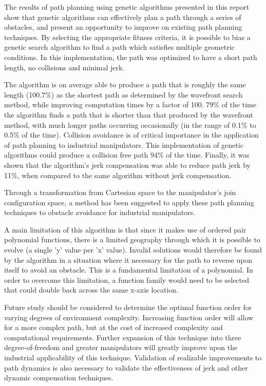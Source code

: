 The results of path planning using genetic algorithms presented in this report show that genetic algorithms can effectively plan a path through a series of obstacles, and present an opportunity to improve on existing path planning techniques. By selecting the appropriate fitness criteria, it is possible to bias a genetic search algorithm to find a path which satisfies multiple geometric conditions. In this implementation, the path was optimized to have a short path length, no collisions and minimal jerk.

The algorithm is on average able to produce a path that is roughly the same length (100.7\%) as the shortest path as determined by the wavefront search method, while improving computation times by a factor of 100. 79\% of the time the algorithm finds a path that is shorter than that produced by the wavefront method, with much longer paths occurring occasionally (in the range of 0.1\% to 0.5\% of the time). Collision avoidance is of critical importance in the application of path planning to industrial manipulators. This implementation of genetic algorithms could produce a collision free path 94\% of the time. Finally, it was shown that the algorithm's jerk compensation was able to reduce path jerk by 11\%, when compared to the same algorithm without jerk compensation.

Through a transformation from Cartesian space to the manipulator's join configuration space, a method has been suggested to apply these path planning techniques to obstacle avoidance for industrial manipulators.

A main limitation of this algorithm is that since it makes use of ordered pair polynomial functions, there is a limited geography through which it is possible to evolve (a single 'y' value per 'x' value). Invalid solutions would therefore be found by the algorithm in a situation where it necessary for the path to reverse upon itself to avoid an obstacle. This is a fundamental limitation of a polynomial. In order to overcome this limitation, a function family would need to be selected that could double back across the same x-axis location.

Future study should be considered to determine the optimal function order for varying degrees of environment complexity. Increasing function order will allow for a more complex path, but at the cost of increased complexity and computational requirements. Further expansion of this technique into three degree-of-freedom and greater manipulators will greatly improve upon the industrial applicability of this technique. Validation of realizable improvements to path dynamics is also necessary to validate the effectiveness of jerk and other dynamic compensation techniques.